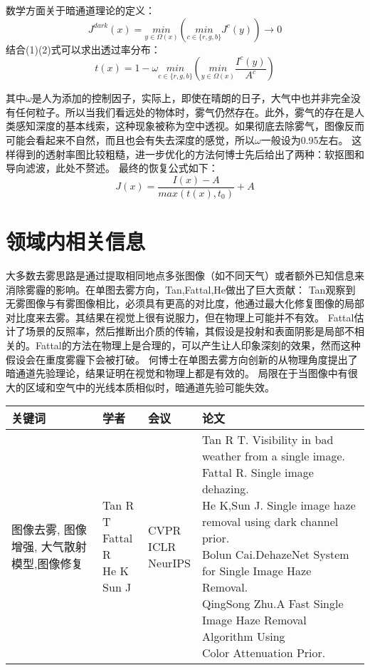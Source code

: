 \documentclass[conference]{IEEEtran}
\begin{document}
数学方面关于暗通道理论的定义：
\begin{equation}
    {J}^{dark}(x) = \underset{y\in\Omega(x)}{min} (\underset{c\in\{r,g,b\}}{min} J^c(y))\rightarrow0
\end{equation}
结合(1)(2)式可以求出透过率分布：
\begin{equation}
    t(x) = 1 - \omega \underset{c\in\{r,g,b\}}{min}(\underset{y\in\Omega(x)}{min} \frac{I^c(y)}{A^c})
\end{equation}

其中$\omega$是人为添加的控制因子，实际上，即使在晴朗的日子，大气中也并非完全没有任何粒子。所以当我们看远处的物体时，雾气仍然存在。此外，雾气的存在是人类感知深度的基本线索，这种现象被称为空中透视。如果彻底去除雾气，图像反而可能会看起来不自然，而且也会有失去深度的感觉，所以$\omega$一般设为0.95左右。\cite{he2010single}
这样得到的透射率图比较粗糙，进一步优化的方法何博士先后给出了两种：软抠图和导向滤波，此处不赘述。
最终的恢复公式如下：
\begin{equation}
    J(x) = \frac{I(x)-A}{max(t(x),t_0)} + A
\end{equation}
\newpage


\section{领域内相关信息}
大多数去雾思路是通过提取相同地点多张图像（如不同天气）或者额外已知信息来
消除雾霾的影响。在单图去雾方向，Tan,Fattal,He做出了巨大贡献：
Tan观察到无雾图像与有雾图像相比，必须具有更高的对比度，他通过最大化修复图像的局部对比度来去雾。其结果在视觉上很有说服力，但在物理上可能并不有效。\cite{tan2008visibility}
Fattal估计了场景的反照率，然后推断出介质的传输，其假设是投射和表面阴影是局部不相关的。Fattal的方法在物理上是合理的，可以产生让人印象深刻的效果，然而这种假设会在重度雾霾下会被打破。\cite{fattal2008single}
何博士在单图去雾方向创新的从物理角度提出了暗通道先验理论，结果证明在视觉和物理上都是有效的。
局限在于当图像中有很大的区域和空气中的光线本质相似时，暗通道先验可能失效。
\par

\begin{tabular}{|p{2cm}|p{2cm}|p{2cm}|p{11cm}|}
\hline
    关键词 & 学者 & 会议 & 论文\\
\hline
    图像去雾, 图像增强, 大气散射模型,图像修复 &
    \makecell{Tan R T \\ Fattal R \\ He K\\Sun J}&
    \makecell{CVPR \\ICLR \\ NeurIPS} &
    \makecell[l]{Tan R T. Visibility in bad weather from a single image.
\\Fattal R. Single image dehazing.
\\ He K,Sun J. Single image haze removal using dark channel prior.
\\Bolun Cai.DehazeNet System for Single Image Haze Removal.
\\QingSong Zhu.A Fast Single Image Haze Removal Algorithm Using\\ Color Attenuation Prior.
}\\
\hline
\end{tabular}



\end{document}
